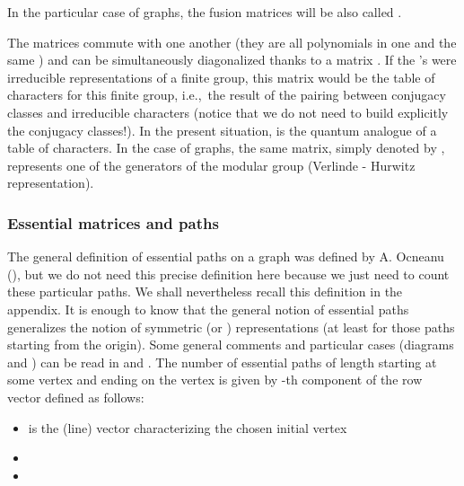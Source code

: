 \documentclass[a4paper,11pt]{article}
\def\ie{{\rm i.e.,\/}\ }
\providecommand{\ZZ}{\mathbb{Z}}
\begin{document}
In the particular case of \coordHE{} graphs, the fusion matrices \coordHE{} will
be also called \coordHE{}.

The \coordHE{} matrices \coordHE{} commute with one another (they are all polynomials in one and 
the same \coordHE{}) and can be simultaneously
diagonalized thanks to a matrix \coordHE{}.
If the \coordHE{}'s were irreducible representations of a finite group,
this matrix \coordHE{} would be the table of characters for this finite
group, \ie the
result of the pairing between conjugacy classes and irreducible characters
(notice that we do not need
to build explicitly the conjugacy classes!). In the present situation,
\coordHE{} is the quantum analogue of a table of characters.
In the case of \coordHE{} graphs, the same matrix, simply denoted by
\coordHE{}, represents one of the
generators of the
modular group \myHighlight{$SL(2,\ZZ)$}\coordHE{} (Verlinde - Hurwitz representation).

\subsubsection{Essential matrices and paths}
The general definition of essential paths on a graph was defined by
A. Ocneanu (\cite{Ocneanu:paths}), but we do not need this precise
definition here because we just need
to count these particular paths. We shall nevertheless recall this
definition in the appendix. It is enough to know that
the general notion of essential paths generalizes the notion of symmetric
(or \coordHE{}) representations (at least for those paths starting
from the origin). Some general comments and
particular cases (diagrams \coordHE{} and
\coordHE{}) can be read in \cite{Coque:Karpacz} and \cite{Coque:qtetra}.
The number \coordHE{} of essential paths of length \coordHE{} starting at some
vertex \coordHE{} and ending on the vertex \coordHE{} is given by \coordHE{}-th component of the
row vector \coordHE{} defined as follows:
\begin{itemize}
\item {}\coordHE{} is the  (line) vector characterizing the chosen initial
vertex
\item {}\coordHE{}
\item {}\coordHE{}
\end{itemize}
\end{document}
